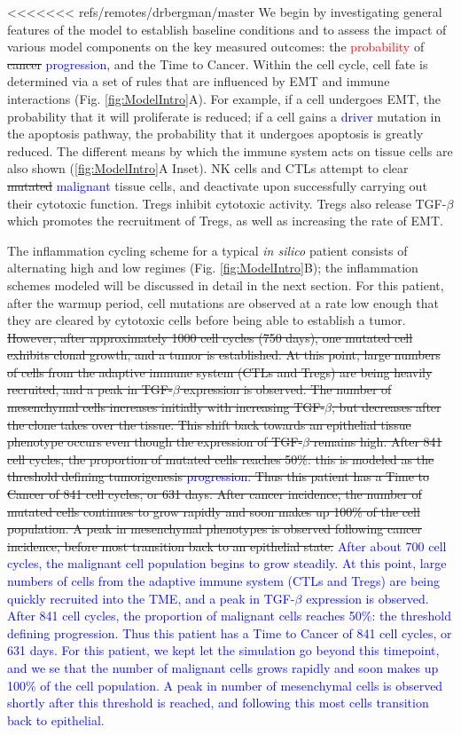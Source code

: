 \documentclass[11pt]{article}
\newcommand{\tcr} { \textcolor{red} }
\newcommand{\tcb} { \textcolor{blue} }
\begin{document}
<<<<<<< refs/remotes/drbergman/master
We begin by investigating general features of the model to establish baseline conditions and to assess the impact of various model components on the key measured outcomes: the \tcr{probability} of \sout{cancer} \tcb{progression}, and the Time to Cancer. 
Within the cell cycle, cell fate is determined via a set of rules that are influenced by EMT and immune interactions (Fig. \ref{fig:ModelIntro}A). For example, if a cell undergoes EMT, the probability that it will proliferate is reduced; if a cell gains a \tcb{driver} mutation in the apoptosis pathway, the probability that it undergoes apoptosis is greatly reduced.
The different means by which the immune system acts on tissue cells are also shown (\ref{fig:ModelIntro}A Inset). NK cells and CTLs attempt to clear \sout{mutated} \tcb{malignant} tissue cells, and deactivate upon successfully carrying out their cytotoxic function.
Tregs inhibit cytotoxic activity.
Tregs also release TGF-$\beta$ which promotes the recruitment of Tregs, as well as increasing the rate of EMT.
\par
The inflammation cycling scheme for a typical {\it in silico} patient consists of alternating high and low regimes (Fig. \ref{fig:ModelIntro}B); the inflammation schemes modeled will be discussed in detail in the next section.
For this patient, after the warmup period, cell mutations are observed at a rate low enough that they are cleared by cytotoxic cells before being able to establish a tumor.
\sout{
However, after approximately 1000 cell cycles (750 days), one mutated cell exhibits clonal growth, and a tumor is established.
At this point, large numbers of cells from the adaptive immune system (CTLs and Tregs) are being heavily recruited, and a peak in TGF-$\beta$ expression is observed.
The number of mesenchymal cells increases initially with increasing TGF-$\beta$, but decreases after the clone takes over the tissue.
This shift back towards an epithelial tissue phenotype occurs even though the expression of TGF-$\beta$ remains high.
After 841 cell cycles, the proportion of mutated cells reaches 50\%: this is modeled as the threshold defining \sout{tumorigenesis} \tcb{progression}.
Thus this patient has a Time to Cancer of 841 cell cycles, or 631 days. 
After cancer incidence, the number of mutated cells continues to grow rapidly and soon makes up 100\% of the cell population. A peak in mesenchymal phenotypes is observed following cancer incidence, before most transition back to an epithelial state.}
\tcb{
After about 700 cell cycles, the malignant cell population begins to grow steadily.
At this point, large numbers of cells from the adaptive immune system (CTLs and Tregs) are being quickly recruited into the TME, and a peak in TGF-$\beta$ expression is observed.
After 841 cell cycles, the proportion of malignant cells reaches 50\%: the threshold defining progression.
Thus this patient has a Time to Cancer of 841 cell cycles, or 631 days.
For this patient, we kept let the simulation go beyond this timepoint, and we se that the number of malignant cells grows rapidly and soon makes up 100\% of the cell population.
A peak in number of mesenchymal cells is observed shortly after this threshold is reached, and following this most cells transition back to epithelial.
}
\end{document}
